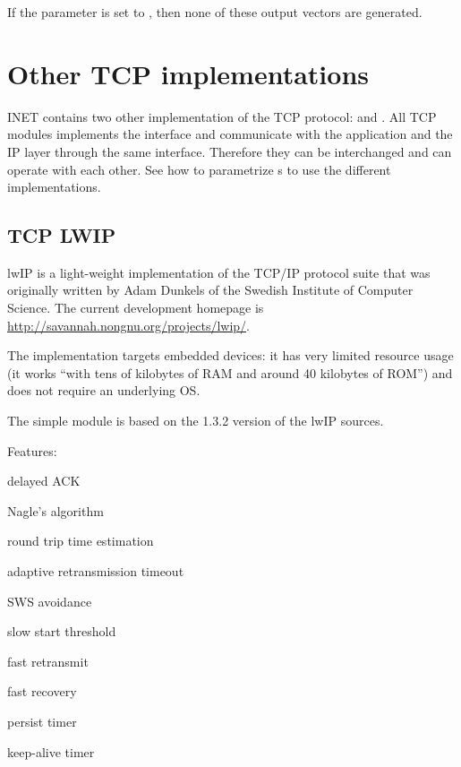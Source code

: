 If the  parameter is set to , then none
of these output vectors are generated.

%
%

\section{Other TCP implementations}
\label{sec:other_tcp}

INET contains two other implementation of the TCP protocol:
 and .
All TCP modules implements the  interface and
communicate with the application and the IP layer through the
same interface. Therefore they can be interchanged and can
operate with each other. See 
how to parametrize s to use the different
implementations.

\subsection{TCP LWIP}

lwIP is a light-weight implementation of the TCP/IP protocol suite
that was originally written by Adam Dunkels of the Swedish Institute of
Computer Science. The current development homepage is
\url{http://savannah.nongnu.org/projects/lwip/}.

The implementation targets embedded devices: it has
very limited resource usage (it works ``with tens of kilobytes of RAM and
around 40 kilobytes of ROM'') and does not require an underlying OS.

The  simple module is based on the 1.3.2 version of
the lwIP sources.

Features:

\begin{compactitem}
\item delayed ACK
\item Nagle's algorithm
\item round trip time estimation
\item adaptive retransmission timeout
\item SWS avoidance
\item slow start threshold
\item fast retransmit
\item fast recovery
\item persist timer
\item keep-alive timer
\end{compactitem}

